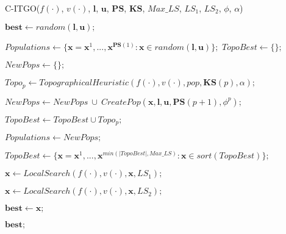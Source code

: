\begin{algorithm*}
\caption{C-ITGO($f(\cdot)$, $v(\cdot)$, $\bm{l}$, $\bm{u}$, $\bm{PS}$, $\bm{KS}$, $Max\_LS$, $LS_1$, $LS_2$, $\phi$, $\alpha$)}
\label{alg:ITGO}
\begin{spacing}{1.5}
\begin{algorithmic}[1]

\Statex
\State $\bm{best} \gets random(\bm{l}, \bm{u});$



\State $Populations \gets \{\bm{x} = \bm{x}^1, ..., \bm{x}^{\bm{PS}(1)} : \bm{x} \in random(\bm{l}, \bm{u}) \};$
\State $TopoBest \gets \{\};$


\State $NewPops \gets \{\};$


\State $Topo_p \gets TopographicalHeuristic(f(\cdot), v(\cdot), pop, \bm{KS}(p), \alpha);$



\State $NewPops \gets NewPops \ \cup \ CreatePop(\bm{x}, \bm{l}, \bm{u},\bm{PS}(p+1), \phi^p);$
\EndFor

\Else
\State $TopoBest \gets TopoBest \cup Topo_p;$
\EndIf
\EndFor

\State $Populations \gets NewPops;$
\EndIf
\EndFor

\State $TopoBest \gets \{\bm{x} = \bm{x}^1, ..., \bm{x}^{min(|TopoBest|, Max\_LS)} : \bm{x} \in sort(TopoBest)\};$


\State $\bm{x} \gets LocalSearch(f(\cdot), v(\cdot), \bm{x}, LS_1);$



\State $\bm{x} \gets LocalSearch(f(\cdot), v(\cdot), \bm{x}, LS_2);$


\State $\bm{best} \gets \bm{x};$
\EndIf
\EndIf

\EndFor

\EndWhile

\State \Return $\bm{best};$


\end{algorithmic}
\end{spacing}
\end{algorithm*}